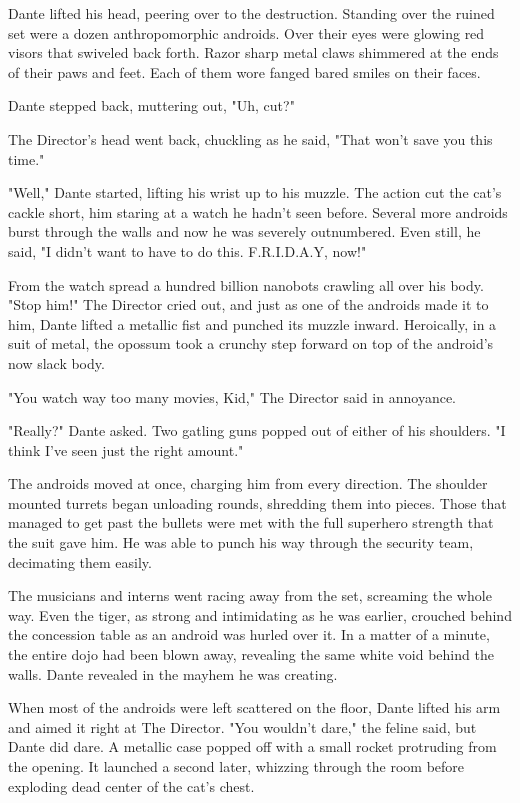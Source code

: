 Dante lifted his head, peering over to the destruction. Standing over the ruined set were a dozen anthropomorphic androids. Over their eyes were glowing red visors that swiveled back forth. Razor sharp metal claws shimmered at the ends of their paws and feet. Each of them wore fanged bared smiles on their faces.

Dante stepped back, muttering out, "Uh, cut?"

The Director's head went back, chuckling as he said, "That won't save you this time."

"Well," Dante started, lifting his wrist up to his muzzle. The action cut the cat's cackle short, him staring at a watch he hadn't seen before. Several more androids burst through the walls and now he was severely outnumbered. Even still, he said, "I didn't want to have to do this. F.R.I.D.A.Y, now!"

From the watch spread a hundred billion nanobots crawling all over his body. "Stop him!" The Director cried out, and just as one of the androids made it to him, Dante lifted a metallic fist and punched its muzzle inward. Heroically, in a suit of metal, the opossum took a crunchy step forward on top of the android's now slack body.

"You watch way too many movies, Kid," The Director said in annoyance.

"Really?" Dante asked. Two gatling guns popped out of either of his shoulders. "I think I've seen just the right amount."

The androids moved at once, charging him from every direction. The shoulder mounted turrets began unloading rounds, shredding them into pieces. Those that managed to get past the bullets were met with the full superhero strength that the suit gave him. He was able to punch his way through the security team, decimating them easily.

The musicians and interns went racing away from the set, screaming the whole way. Even the tiger, as strong and intimidating as he was earlier, crouched behind the concession table as an android was hurled over it. In a matter of a minute, the entire dojo had been blown away, revealing the same white void behind the walls. Dante revealed in the mayhem he was creating.

When most of the androids were left scattered on the floor, Dante lifted his arm and aimed it right at The Director. "You wouldn't dare," the feline said, but Dante did dare. A metallic case popped off with a small rocket protruding from the opening. It launched a second later, whizzing through the room before exploding dead center of the cat's chest.

